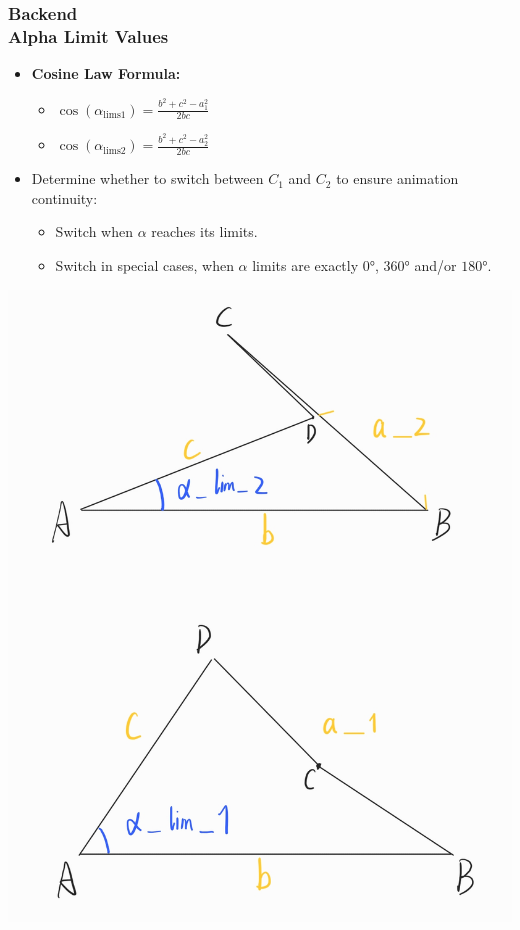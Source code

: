 \documentclass[ucs,10pt]{beamer}
\begin{document}
\begin{frame}
    \frametitle{Backend \\ \small \color{rwth-blue} Alpha Limit Values}
    \begin{minipage}{0.5\linewidth}
        \begin{itemize}
            \item \textbf{Cosine Law Formula:}
            \begin{itemize}
                \item $ \cos(\alpha_{\text{lims1}}) = \frac{b^2 + c^2 - a_1^2}{2bc}$ 
                \item $\cos(\alpha_{\text{lims2}}) = \frac{b^2 + c^2 - a_2^2}{2bc}$
            \end{itemize}
            \item Determine whether to switch between $C_1$ and $C_2$ to ensure animation continuity:
            \begin{itemize}
            	\item Switch when $\alpha$ reaches its limits.
            	\item Switch in special cases, when $\alpha$ limits are exactly $0$°, $360$° and/or $180$°.
            \end{itemize}
        \end{itemize}
    \end{minipage}
    \hspace{0.02\linewidth} %
    \begin{minipage}{0.45\linewidth}
        \begin{center}
            \includegraphics[width=\linewidth]{./Figures/alpha_lim.png}

\end{center}
\end{minipage}
\end{frame}
\end{document}
